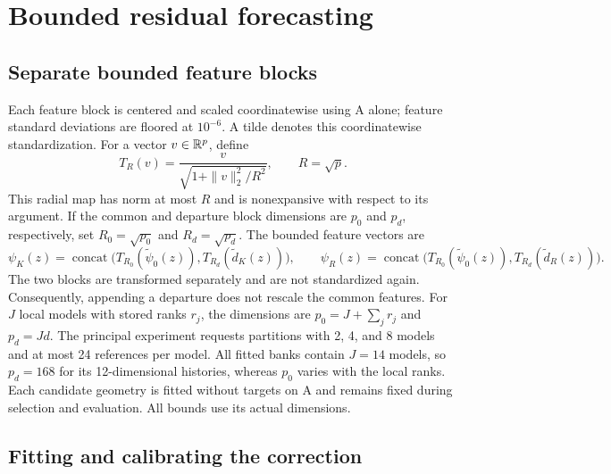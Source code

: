 \section{Bounded residual forecasting}\label{sec:bounded-decoder}

\subsection{Separate bounded feature blocks}


Each feature block is centered and scaled coordinatewise using A alone;
feature standard deviations are floored at $10^{-6}$. A tilde denotes
this coordinatewise standardization. For a vector $v\in\mathbb{R}^p$, define
\begin{equation}
 T_R(v)=\frac{v}{\sqrt{1+\|v\|_2^2/R^2}},\qquad R=\sqrt p.
 \label{eq:mechanism-main-radial}
\end{equation}
This radial map has norm at most $R$ and is nonexpansive with respect to
its argument. If the common and departure block dimensions are $p_0$
and $p_d$, respectively, set $R_0=\sqrt{p_0}$ and $R_d=\sqrt{p_d}$.
The bounded feature vectors are
\[
 \psi_K(z)=\operatorname{concat}\bigl(
       T_{R_0}(\widetilde\psi_0(z)),T_{R_d}(\widetilde d_K(z))\bigr),
 \qquad
 \psi_R(z)=\operatorname{concat}\bigl(
       T_{R_0}(\widetilde\psi_0(z)),T_{R_d}(\widetilde d_R(z))\bigr).
\]
The two blocks are transformed separately and are not standardized again.
Consequently, appending a departure does not rescale the common features.
For $J$ local models with stored ranks $r_j$, the dimensions are
$p_0=J+\sum_j r_j$ and $p_d=Jd$. The principal experiment requests
partitions with 2, 4, and 8 models and at most 24 references per model.
All fitted banks contain $J=14$ models, so $p_d=168$ for its
12-dimensional histories, whereas $p_0$ varies with the local ranks.
Each candidate geometry is fitted without targets on A and remains fixed
during selection and evaluation. All bounds use its actual dimensions.

\subsection{Fitting and calibrating the correction}

